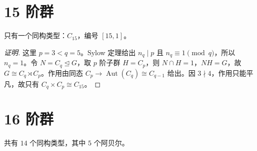 \documentclass[UTF8,fontset=fandol,11pt,a4paper]{ctexart}
\newcommand{\Aut}{\operatorname{Aut}}\newcommand{\GL}{\operatorname{GL}}\newcommand{\ord}{\operatorname{ord}}\newcommand{\Z}{\mathrm Z}
\begin{document}
\section*{15 阶群}\label{order:15}

只有一个同构类型：$C_{15}$，编号 $[15,1]$。

\begin{proof}[证明]
这里 $p=3<q=5$。Sylow 定理给出 $n_q\mid p$ 且 $n_q\equiv1\pmod q$，所以 $n_q=1$。令 $N=C_q\trianglelefteq G$，取 $p$ 阶子群 $H=C_p$，则 $N\cap H=1$，$NH=G$，故 $G\cong C_q\rtimes C_p$。作用由同态 $C_p\to\Aut(C_q)\cong C_{q-1}$ 给出。因 $3\nmid 4$，作用只能平凡，故只有 $C_q\times C_p\cong C_{15}$。
\end{proof}

\section*{16 阶群}\label{order:16}

共有 $14$ 个同构类型，其中 $5$ 个阿贝尔。

\begingroup\small\setlength{\tabcolsep}{3pt}\renewcommand{\arraystretch}{1.12}
\end{document}
